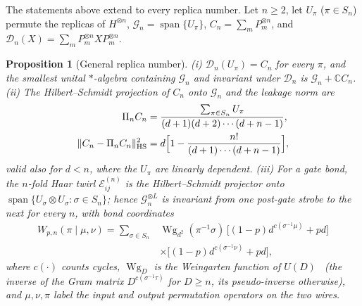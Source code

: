 \documentclass[aps,prx,reprint,superscriptaddress,nobibnotes,longbibliography]{revtex4-2}
\newtheorem{proposition}{Proposition}
\theoremstyle{remark}
\newcommand{\HS}{\mathrm{HS}}
\newcommand{\Wg}{\operatorname{Wg}}
\begin{document}
The statements above extend to every replica number.  Let $n\ge2$, let $U_\pi$ ($\pi\in S_n$) permute the replicas of $H^{\otimes n}$, $\mathcal G_n=\operatorname{span}\{U_\pi\}$, $C_n=\sum_mP_m^{\otimes n}$, and $\mathcal D_n(X)=\sum_mP_m^{\otimes n}XP_m^{\otimes n}$.

\begin{proposition}[General replica number]
\label{prop:general-n}
(i) $\mathcal D_n(U_\pi)=C_n$ for every $\pi$, and the smallest unital $*$-algebra containing $\mathcal G_n$ and invariant under $\mathcal D_n$ is $\mathcal G_n+\mathbb CC_n$.
(ii) The Hilbert--Schmidt projection of $C_n$ onto $\mathcal G_n$ and the leakage norm are
\begin{align}
 \Pi_nC_n&=\frac{\sum_{\pi\in S_n}U_\pi}{(d+1)(d+2)\cdots(d+n-1)},\nonumber\\
 \|C_n-\Pi_nC_n\|_{\HS}^2&=d\Bigl[1-\frac{n!}{(d+1)\cdots(d+n-1)}\Bigr],
 \label{eq:leak-n}
\end{align}
valid also for $d<n$, where the $U_\pi$ are linearly dependent.
(iii) For a gate bond, the $n$-fold Haar twirl $\mathcal E^{(n)}_{ij}$ is the Hilbert--Schmidt projector onto $\operatorname{span}\{U_\sigma\otimes U_\sigma:\sigma\in S_n\}$; hence $\mathcal G_n^{\otimes L}$ is invariant from one post-gate strobe to the next for every $n$, with bond coordinates
\begin{align}
 W_{p,n}(\pi\mid\mu,\nu)=\sum_{\sigma\in S_n}&\Wg_{d^2}(\pi^{-1}\sigma)\,
 \bigl[(1-p)d^{c(\sigma^{-1}\mu)}+pd\bigr]\nonumber\\
 &\times\bigl[(1-p)d^{c(\sigma^{-1}\nu)}+pd\bigr],
 \label{eq:Wpn}
\end{align}
where $c(\cdot)$ counts cycles, $\Wg_{D}$ is the Weingarten function of $U(D)$~\cite{Collins2003,CollinsSniady2006} (the inverse of the Gram matrix $D^{c(\sigma^{-1}\tau)}$ for $D\ge n$, its pseudo-inverse otherwise), and $\mu,\nu,\pi$ label the input and output permutation operators on the two wires.
\end{proposition}
\end{document}
